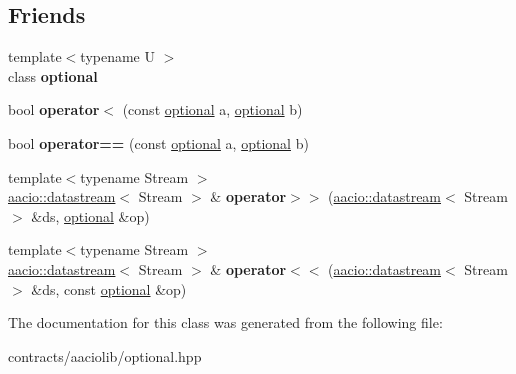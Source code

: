 \subsection*{Friends}
\begin{DoxyCompactItemize}
\item 
\mbox{\label{classaacio_1_1optional_aa756d67787488b1e2bba885ce4da6fe0}} 
{\footnotesize template$<$typename U $>$ }\\class {\bfseries optional}
\item 
\mbox{\label{classaacio_1_1optional_aed3aa0cd5eb4f7ef600b2e9ad295320f}} 
bool {\bfseries operator$<$} (const \mbox{\hyperlink{classaacio_1_1optional}{optional}} a, \mbox{\hyperlink{classaacio_1_1optional}{optional}} b)
\item 
\mbox{\label{classaacio_1_1optional_a608be2170eb1ffcef97954156c7ebbd8}} 
bool {\bfseries operator==} (const \mbox{\hyperlink{classaacio_1_1optional}{optional}} a, \mbox{\hyperlink{classaacio_1_1optional}{optional}} b)
\item 
\mbox{\label{classaacio_1_1optional_ac832bb17538296c8ef66f0250d9fcd54}} 
{\footnotesize template$<$typename Stream $>$ }\\\mbox{\hyperlink{classaacio_1_1datastream}{aacio\+::datastream}}$<$ Stream $>$ \& {\bfseries operator$>$$>$} (\mbox{\hyperlink{classaacio_1_1datastream}{aacio\+::datastream}}$<$ Stream $>$ \&ds, \mbox{\hyperlink{classaacio_1_1optional}{optional}} \&op)
\item 
\mbox{\label{classaacio_1_1optional_a61ac09dcfc7a19fdd3f1cec5578004f6}} 
{\footnotesize template$<$typename Stream $>$ }\\\mbox{\hyperlink{classaacio_1_1datastream}{aacio\+::datastream}}$<$ Stream $>$ \& {\bfseries operator$<$$<$} (\mbox{\hyperlink{classaacio_1_1datastream}{aacio\+::datastream}}$<$ Stream $>$ \&ds, const \mbox{\hyperlink{classaacio_1_1optional}{optional}} \&op)
\end{DoxyCompactItemize}


The documentation for this class was generated from the following file\+:\begin{DoxyCompactItemize}
\item 
contracts/aaciolib/optional.\+hpp\end{DoxyCompactItemize}
